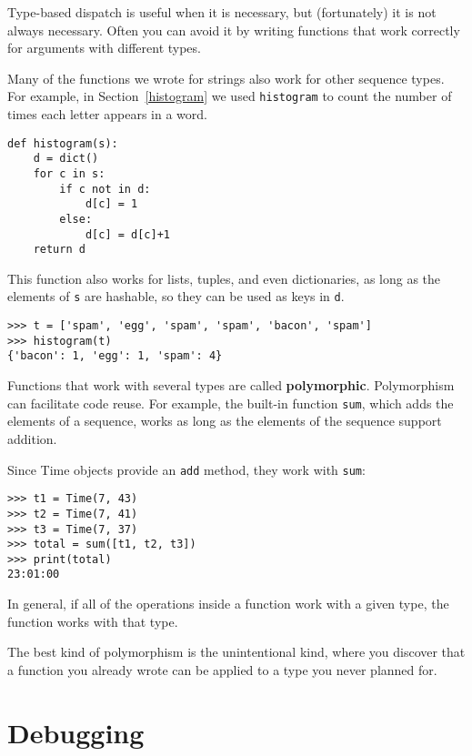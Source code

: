 Type-based dispatch is useful when it is necessary, but (fortunately)
it is not always necessary.  Often you can avoid it by writing functions
that work correctly for arguments with different types.

Many of the functions we wrote for strings also
work for other sequence types.
For example, in Section~\ref{histogram}
we used {\tt histogram} to count the number of times each letter
appears in a word.

\begin{lstlisting}
def histogram(s):
    d = dict()
    for c in s:
        if c not in d:
            d[c] = 1
        else:
            d[c] = d[c]+1
    return d
\end{lstlisting}
%
This function also works for lists, tuples, and even dictionaries,
as long as the elements of {\tt s} are hashable, so they can be used
as keys in {\tt d}.

\begin{lstlisting}
>>> t = ['spam', 'egg', 'spam', 'spam', 'bacon', 'spam']
>>> histogram(t)
{'bacon': 1, 'egg': 1, 'spam': 4}
\end{lstlisting}
%
Functions that work with several types are called {\bf polymorphic}.
Polymorphism can facilitate code reuse.  For example, the built-in
function {\tt sum}, which adds the elements of a sequence, works
as long as the elements of the sequence support addition.

Since Time objects provide an {\tt add} method, they work
with {\tt sum}:

\begin{lstlisting}
>>> t1 = Time(7, 43)
>>> t2 = Time(7, 41)
>>> t3 = Time(7, 37)
>>> total = sum([t1, t2, t3])
>>> print(total)
23:01:00
\end{lstlisting}
%
In general, if all of the operations inside a function
work with a given type, the function works with that type.

The best kind of polymorphism is the unintentional kind, where
you discover that a function you already wrote can be
applied to a type you never planned for.


\section{Debugging}

